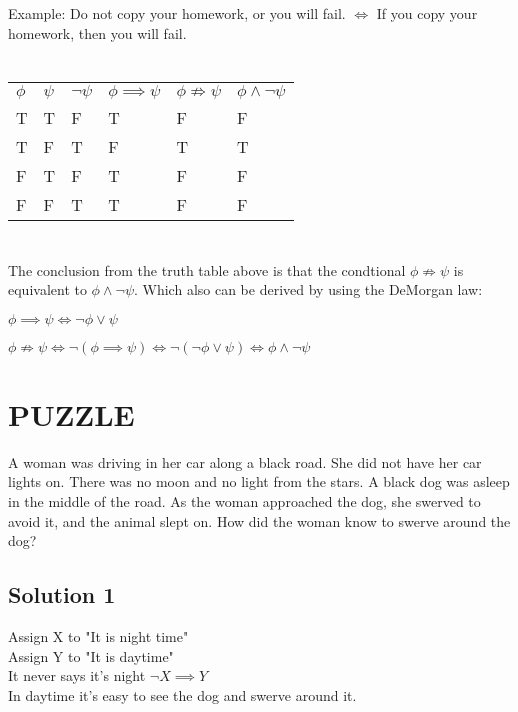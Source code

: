 \documentclass{article}
\begin{document}
Example:
Do not copy your homework, or you will fail. $\Leftrightarrow$ If you copy your homework, then you will fail.

\section{}
\begin{tabular}{ l l l l l l }
  $\phi$ & $\psi$ & $\neg \psi$ & $\phi \implies \psi$ & $\phi \not\Rightarrow \psi$ & $\phi \wedge \neg \psi$ \\
  T      & T      & F           & T                    & F                           & F                       \\
  T      & F      & T           & F                    & T                           & T                       \\
  F      & T      & F           & T                    & F                           & F                       \\
  F      & F      & T           & T                    & F                           & F                       \\
\end{tabular}

\section{}
The conclusion from the truth table above is that the condtional $\phi \not\Rightarrow \psi$ is equivalent to $\phi \wedge \neg \psi$.
Which also can be derived by using the DeMorgan law:

$\phi \implies \psi \Leftrightarrow \neg \phi \vee \psi$

$\phi \not\Rightarrow \psi \Leftrightarrow \neg(\phi \implies \psi) \Leftrightarrow \neg(\neg \phi \vee \psi) \Leftrightarrow \phi \wedge \neg \psi$

\section{PUZZLE}
A woman was driving in her car along a black road.
She did not have her car lights on.
There was no moon and no light from the stars.
A black dog was asleep in the middle of the road.
As the woman approached the dog, she swerved to avoid it, and the animal slept on.
How did the woman know to swerve around the dog?

\subsection{Solution 1}
Assign X to "It is night time" \\
Assign Y to "It is daytime" \\
It never says it's night $\neg X \implies Y$ \\
In daytime it's easy to see the dog and swerve around it.
\end{document}
